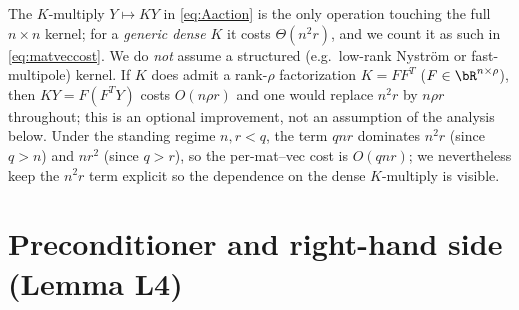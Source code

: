 \begin{remark}\label{rem:honestcost}
The $K$-multiply $Y\mapsto KY$ in \eqref{eq:Aaction} is the only operation
touching the full $n\times n$ kernel; for a \emph{generic dense} $K$ it costs
$\Theta(n^{2}r)$, and we count it as such in \eqref{eq:matveccost}. We do
\emph{not} assume a structured (e.g.\ low-rank Nystr\"om or fast-multipole)
kernel. If $K$ does admit a rank-$\rho$ factorization $K=FF^{T}$
($F\in\bR^{n\times\rho}$), then $KY=F(F^{T}Y)$ costs $O(n\rho r)$ and one would
replace $n^{2}r$ by $n\rho r$ throughout; this is an optional improvement, not
an assumption of the analysis below. Under the standing regime
$n,r<q$, the term $qnr$ dominates $n^{2}r$ (since $q>n$) and $nr^{2}$ (since
$q>r$), so the per-mat--vec cost is $O(qnr)$; we nevertheless keep the
$n^{2}r$ term explicit so the dependence on the dense $K$-multiply is visible.
\end{remark}

\section*{Preconditioner and right-hand side (Lemma L4)}

